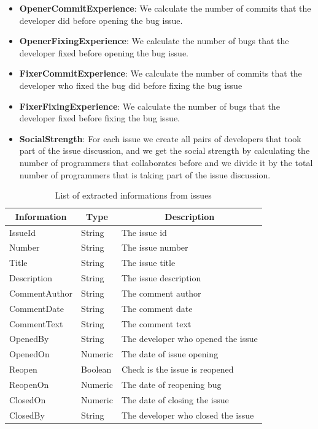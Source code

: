 \documentclass[sigconf,review]{acmart}
\begin{document}
\begin{itemize}
  \item{\textbf{OpenerCommitExperience}: We calculate the number of commits that the developer did before opening the bug issue.
  }
  \item{\textbf{OpenerFixingExperience}: We calculate the number of bugs that the developer fixed before opening the bug issue.
  }
  \item{\textbf{FixerCommitExperience}: We calculate the number of commits that the developer who fixed the bug did before fixing the bug issue

  }
  \item{\textbf{FixerFixingExperience}: We calculate the number of bugs that the developer fixed before fixing the bug issue.
  }
\newpage
  \item{\textbf{SocialStrength}: For each issue we create all pairs of developers that took part of the issue discussion, and we get the social strength by 
     calculating the number of programmers that collaborates before and we divide it by the total number of programmers that is taking part of the issue discussion.
  }
\end{itemize}



\begin{table}[h]
\caption{List of extracted informations from issues} \label{table:issues}
\begin{tabular}{lll}
\hline
\hline
\multicolumn{1}{c}{Information}
& \multicolumn{1}{c}{Type}
&	\multicolumn{1}{c}{Description}    \\    

\hline
   IssueId & String & The issue id \\     
    Number & String & The issue number \\
    Title & String &The issue title \\
    Description & String &The issue description \\

    CommentAuthor & String &The comment author \\
    CommentDate & String & The comment date \\
    CommentText & String &The comment text \\
    OpenedBy & String & The developer who opened the issue \\
    OpenedOn & Numeric & The date of issue opening \\

    Reopen & Boolean & Check is the issue is reopened \\
    ReopenOn & Numeric & The date of reopening bug \\
    ClosedOn & Numeric & The date of closing the issue \\
    ClosedBy & String & The developer who closed the issue \\

\hline
\hline
\end{tabular}
\end{table}
\end{document}
